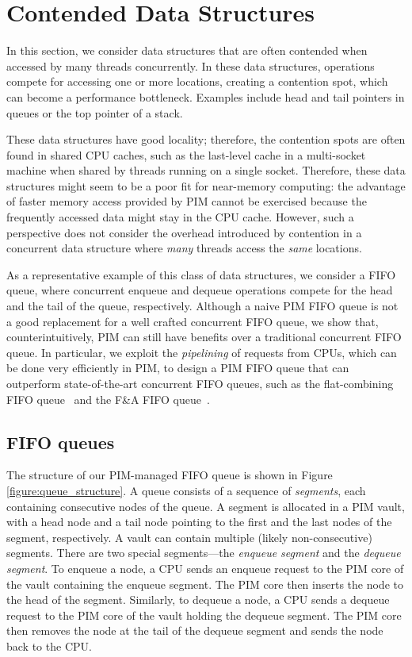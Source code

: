 
\section{Contended Data Structures}
\label{section:contended}
In this section, we consider data structures that are often contended when accessed 
by many threads concurrently. In these data structures, operations compete for accessing one or more 
locations, creating a contention spot, which can become a performance bottleneck.
Examples include head and tail pointers in queues or the top pointer of a stack.

These data structures have good locality; therefore, the contention spots are often found 
in shared CPU caches, such as the last-level cache in a multi-socket machine 
when shared by threads running on a single socket. Therefore, these data structures might 
seem to be a poor fit for near-memory computing: the advantage of faster memory access provided by PIM 
cannot be exercised because the frequently accessed data might stay in the CPU cache. 
However, such a perspective does not consider the overhead introduced by contention 
in a concurrent data structure where \emph{many} threads access the \emph{same} locations. 

As a representative example of this class of data structures, we consider a FIFO queue, 
where concurrent enqueue
and dequeue operations compete for the head and the tail of the queue, respectively. 
Although a naive PIM FIFO queue is not a good replacement for a well crafted concurrent FIFO queue, 
we show that, counterintuitively, PIM can still have benefits over a traditional concurrent FIFO 
queue. In particular, we exploit the \emph{pipelining} of requests from CPUs, 
which can be done very efficiently in PIM, to design a PIM FIFO queue that can outperform 
state-of-the-art concurrent FIFO queues, such as the flat-combining FIFO queue~\cite{Hendler10} 
and the F\&A FIFO queue~\cite{Morrison13}.

\subsection{FIFO queues}
The structure of our PIM-managed FIFO queue is shown in Figure \ref{figure:queue_structure}.
A queue consists of a sequence of \emph{segments}, each containing consecutive nodes of the queue.
A segment is allocated in a PIM vault, with a head node and a tail node pointing to the first 
and the last nodes of the segment, respectively.
A vault can contain multiple (likely non-consecutive) segments. 
There are two special segments---the \textit{enqueue segment} and the \textit{dequeue segment}.
To enqueue a node, a CPU sends an enqueue request to the PIM core of the vault 
containing the enqueue segment.
The PIM core then inserts the node to the head of the segment.
Similarly, to dequeue a node, a CPU sends a dequeue request to the PIM core of the vault
holding the dequeue segment. 
The PIM core then removes the node at the tail of the dequeue segment and 
sends the node back to the CPU.

